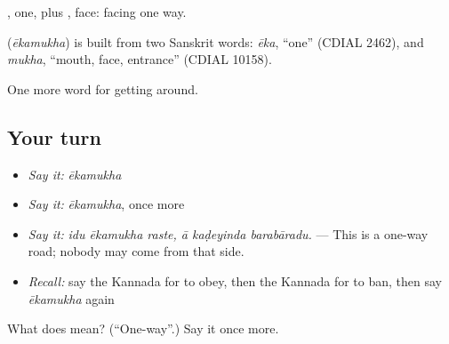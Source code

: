 , one, plus , face: facing one way.

\begin{cousinweb}
\textbf{} (\emph{ēkamukha}) is built from two Sanskrit words: \emph{ēka}, \textquotedblleft{}one\textquotedblright{} (CDIAL 2462), and \emph{mukha}, \textquotedblleft{}mouth, face, entrance\textquotedblright{} (CDIAL 10158).
\end{cousinweb}

\begin{grammarlens}[title={What you've built}]
One more word for getting around.
\end{grammarlens}

\subsection*{Your turn}
\begin{itemize}
\raggedright
  \item \emph{Say it:} \emph{ēkamukha}
  \item \emph{Say it:} \emph{ēkamukha}, once more
  \item \emph{Say it:} \emph{idu ēkamukha raste, ā kaḍeyinda barabāradu.} — This is a one-way road; nobody may come from that side.
  \item \emph{Recall:} say the Kannada for to obey, then the Kannada for to ban, then say \emph{ēkamukha} again
\end{itemize}

\begin{tcolorbox}[breakable,colback=teal!4,colframe=teal!35!black,title={Before you move on}]
What does  mean? (\textquotedblleft{}One-way\textquotedblright{}.) Say it once more.
\end{tcolorbox}
